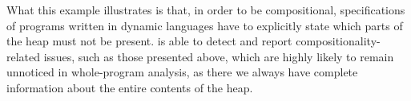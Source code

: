 %

What this example illustrates is that, in order to be compositional, specifications of programs written in dynamic languages have to explicitly state which parts of the heap must not be present. \cosette is able to detect and report compositionality-related issues, such as those presented above, which are highly likely to remain unnoticed in whole-program analysis, as there we always have complete information about the entire contents of the heap.

